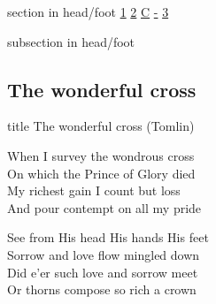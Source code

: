 \documentclass{beamer}
\begin{document}
{
{ 
 {
 \begin{beamercolorbox}[ht=4.5ex,dp=1.5ex,%
      leftskip=.3cm,rightskip=.3cm plus1fil]{section in head/foot}
 \fontsize{12}{25}\selectfont 
\hyperlink{The wonderful cross['When I survey'](Tomlin)1}{1}
\hyperlink{The wonderful cross['When I survey'](Tomlin)2}{2}
\hyperlink{The wonderful cross['When I survey'](Tomlin)C}{C}
\hyperlink{The wonderful cross['When I survey'](Tomlin)-}{-}
\hyperlink{The wonderful cross['When I survey'](Tomlin)3}{3}
 
 \end{beamercolorbox}%
  \begin{beamercolorbox}[ht=2.5ex,dp=1.125ex,%
   leftskip=.3cm,rightskip=.3cm plus1fil]{subsection in head/foot}
   \insertauthor
 \end{beamercolorbox}%
 }
}
\subsection{ The wonderful cross }

\hypertarget{The wonderful cross['When I survey'](Tomlin)}{}
\begin{frame}{}
 \vfill
  \centering
  \begin{beamercolorbox}[sep=8pt,center,shadow=true,rounded=true]{title}
    The wonderful cross (Tomlin)    
  \end{beamercolorbox}
  \vfill
\end{frame}

\hypertarget{The wonderful cross['When I survey'](Tomlin)1}{}
\begin{frame}{}
\fontsize{ 20 }{ 27 }\selectfont

When I survey the wondrous cross\\ 
On which the Prince of Glory died\\ 
My richest gain I count but loss\\ 
And pour contempt on all my pride 

\end{frame}

\hypertarget{The wonderful cross['When I survey'](Tomlin)2}{}
\begin{frame}{}
\fontsize{ 20 }{ 27 }\selectfont

See from His head His hands His feet\\ 
Sorrow and love flow mingled down\\ 
Did e'er such love and sorrow meet\\ 
Or thorns compose so rich a crown 


\end{frame}}
\end{document}
